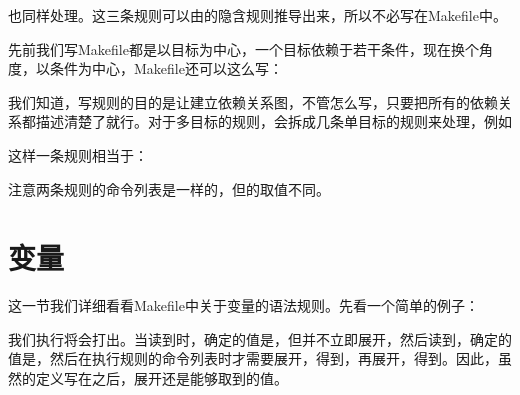 也同样处理。这三条规则可以由的隐含规则推导出来，所以不必写在Makefile中。



先前我们写Makefile都是以目标为中心，一个目标依赖于若干条件，现在换个角度，以条件为中心，Makefile还可以这么写：




我们知道，写规则的目的是让建立依赖关系图，不管怎么写，只要把所有的依赖关系都描述清楚了就行。对于多目标的规则，会拆成几条单目标的规则来处理，例如




这样一条规则相当于：




注意两条规则的命令列表是一样的，但的取值不同。




\section{变量}
%
这一节我们详细看看Makefile中关于变量的语法规则。先看一个简单的例子：




我们执行将会打出。当读到时，确定的值是，但并不立即展开，然后读到，确定的值是，然后在执行规则的命令列表时才需要展开，得到，再展开，得到。因此，虽然的定义写在之后，展开还是能够取到的值。



